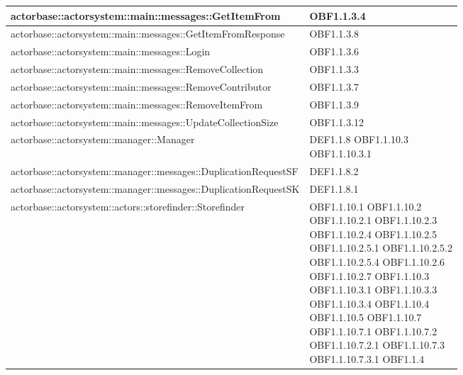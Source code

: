 \documentclass{scalatekids-article}
\begin{document}
\begin{longtable}[H]{|p{12cm}|p{5.5cm}|}
  \hline
  actorbase::actorsystem::main::messages::GetItemFrom & \multiLineCell[t]{OBF1.1.3.4\\}\\
  \hline
  actorbase::actorsystem::main::messages::GetItemFromResponse & \multiLineCell[t]{OBF1.1.3.8\\}\\
  \hline
  actorbase::actorsystem::main::messages::Login & \multiLineCell[t]{OBF1.1.3.6\\}\\
  \hline
  actorbase::actorsystem::main::messages::RemoveCollection & \multiLineCell[t]{OBF1.1.3.3\\}\\
  \hline
  actorbase::actorsystem::main::messages::RemoveContributor & \multiLineCell[t]{OBF1.1.3.7\\}\\
  \hline
  actorbase::actorsystem::main::messages::RemoveItemFrom & \multiLineCell[t]{OBF1.1.3.9\\}\\
  \hline
  actorbase::actorsystem::main::messages::UpdateCollectionSize & \multiLineCell[t]{OBF1.1.3.12\\}\\
  \hline
  actorbase::actorsystem::manager::Manager & \multiLineCell[t]{DEF1.1.8 OBF1.1.10.3\\OBF1.1.10.3.1}\\
  \hline
  actorbase::actorsystem::manager::messages::DuplicationRequestSF & \multiLineCell[t]{DEF1.1.8.2\\}\\
  \hline
  actorbase::actorsystem::manager::messages::DuplicationRequestSK & \multiLineCell[t]{DEF1.1.8.1\\}\\
  \hline
  actorbase::actorsystem::actors::storefinder::Storefinder & \multiLineCell[t]{OBF1.1.10.1 OBF1.1.10.2\\OBF1.1.10.2.1 OBF1.1.10.2.3\\OBF1.1.10.2.4 OBF1.1.10.2.5\\OBF1.1.10.2.5.1 OBF1.1.10.2.5.2\\OBF1.1.10.2.5.4 OBF1.1.10.2.6\\OBF1.1.10.2.7 OBF1.1.10.3\\OBF1.1.10.3.1 OBF1.1.10.3.3\\OBF1.1.10.3.4 OBF1.1.10.4\\OBF1.1.10.5 OBF1.1.10.7\\OBF1.1.10.7.1 OBF1.1.10.7.2\\OBF1.1.10.7.2.1 OBF1.1.10.7.3\\OBF1.1.10.7.3.1 OBF1.1.4\\}\\

\end{longtable}
\end{document}
